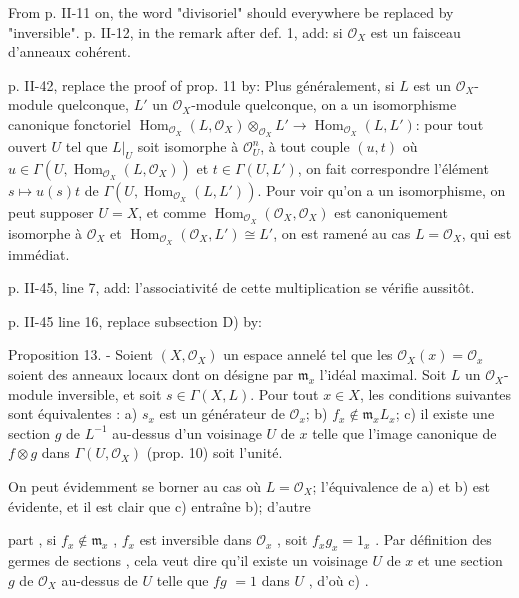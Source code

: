 From p. II-11 on, the word "divisoriel" should everywhere be replaced by "inversible". p. II-12, in the remark after def. 1, add:
si $\mathcal{O}_X$ est un faisceau d'anneaux cohérent.

p. II-42, replace the proof of prop. 11 by:
Plus généralement, si $L$ est un $\mathcal{O}_X$-module quelconque, $L'$ un $\mathcal{O}_X$-module quelconque, on a un isomorphisme canonique fonctoriel $\operatorname{Hom}_{\mathcal{O}_X}(L, \mathcal{O}_X) \otimes_{\mathcal{O}_X} L' \to \operatorname{Hom}_{\mathcal{O}_X}(L, L')$: pour tout ouvert $U$ tel que $L|_U$ soit isomorphe à $\mathcal{O}_U^n$, à tout couple $(u, t)$ où $u \in \Gamma(U, \operatorname{Hom}_{\mathcal{O}_X}(L, \mathcal{O}_X))$ et $t \in \Gamma(U, L')$, on fait correspondre l'élément $s \mapsto u(s)t$ de $\Gamma(U, \operatorname{Hom}_{\mathcal{O}_X}(L, L'))$. Pour voir qu'on a un isomorphisme, on peut supposer $U=X$, et comme $\operatorname{Hom}_{\mathcal{O}_X}(\mathcal{O}_X, \mathcal{O}_X)$ est canoniquement isomorphe à $\mathcal{O}_X$ et $\operatorname{Hom}_{\mathcal{O}_X}(\mathcal{O}_X, L') \cong L'$, on est ramené au cas $L=\mathcal{O}_X$, qui est immédiat.

p. II-45, line 7, add:
l'associativité de cette multiplication se vérifie aussitôt.

p. II-45 line 16, replace subsection D) by:

Proposition 13. - Soient $(X, \mathcal{O}_X)$ un espace annelé tel que les $\mathcal{O}_X(x) = \mathcal{O}_x$ soient des anneaux locaux dont on désigne par $\mathfrak{m}_x$ l'idéal maximal. Soit $L$ un $\mathcal{O}_X$-module inversible, et soit $s \in \Gamma(X, L)$. Pour tout $x \in X$, les conditions suivantes sont équivalentes : a) $s_x$ est un générateur de $\mathcal{O}_x$; b) $f_x \notin \mathfrak{m}_x L_x$; c) il existe une section $g$ de $L^{-1}$ au-dessus d'un voisinage $U$ de $x$ telle que l'image canonique de $f \otimes g$ dans $\Gamma(U, \mathcal{O}_X)$ (prop. 10) soit l'unité.

On peut évidemment se borner au cas où $L=\mathcal{O}_X$; l'équivalence de a) et b) est évidente, et il est clair que c) entraîne b); d'autre

\newpage


part , si $f_x \notin \mathfrak{m}_x$ , $f_x$ est inversible dans $\mathcal{O}_x$ , soit $f_x g_x = 1_x$ . Par
définition des germes de sections , cela veut dire qu'il existe un
voisinage $U$ de $x$ et une section $g$ de $\mathcal{O}_X$ au-dessus de $U$ telle que $fg$
$= 1$ dans $U$ , d'où c) .

